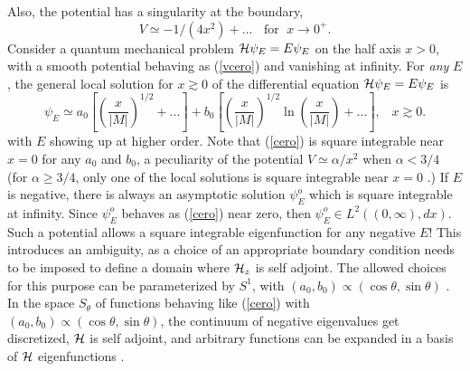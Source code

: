 \documentclass[aps,floats,showpacs,amssymb,tightenlines]{revtex4}
\def\a{\alpha}
\begin{document}
 Also, the potential has a singularity at the boundary,
 \begin{equation} \label{vcero}
 V \simeq -1/(4x^2)+ ... \;\; \text{ for } \; x \to 0^+.
 \end{equation}
 Consider a quantum mechanical problem ${\cal H} \psi_E = E \psi_E$ on the half axis $x>0$, with a smooth potential
 behaving as (\ref{vcero})  and vanishing at infinity.
 For {\em any} $E$, the general local solution for $x \gtrsim 0$
  of the differential equation ${\cal H} \psi_E = E \psi_E$ is
 \begin{equation} \label{cero}
 \psi_E \simeq a_0 \left[ \left(\frac{x}{|M|}\right)^{1/2}  + ... \right] + b_0 \left[  \left(\frac{x}{|M|}\right)^{1/2}  \ln \left(\frac{x}{|M|} \right) + ... \right]
 , \;\;\; x \gtrsim 0.
 \end{equation}
 with  $E$ showing up at higher order.
Note that (\ref{cero}) is
 square integrable near $x=0$ for any $a_0$ and $b_0$, a peculiarity of  the potential
 $V  \simeq \a/x^2$ when $\a < 3/4$ (for $\a \geq 3/4$, only one of the local solutions is square
 integrable near $x=0$ \cite{meetz}.) If $E$ is negative,  there is always an asymptotic solution $\psi_E^o$ which is square
 integrable at infinity. Since $\psi_E^o$  behaves as (\ref{cero}) near zero, then $\psi_E^o \in L^2((0,\infty),dx)$.
 Such a potential allows a square integrable eigenfunction for any negative $E$!
 This introduces an ambiguity, as a choice  of an appropriate
 boundary condition needs to be imposed  to define a domain where ${\cal H}_z$ is self adjoint.
 The allowed choices for this purpose can be  parameterized by $S^1$, with  $(a_0,b_0) \propto (\cos \theta, \sin \theta)$
 \cite{ghi,meetz,reed}. In the space $S_{\theta}$ of functions behaving like (\ref{cero}) with
 $(a_0,b_0) \propto (\cos \theta, \sin \theta)$,
 the continuum of negative eigenvalues get  discretized, ${\cal H}$ is self adjoint, and arbitrary functions can be expanded in a basis of ${\cal H}$ eigenfunctions \cite{ghi,meetz,reed}.
\end{document}
